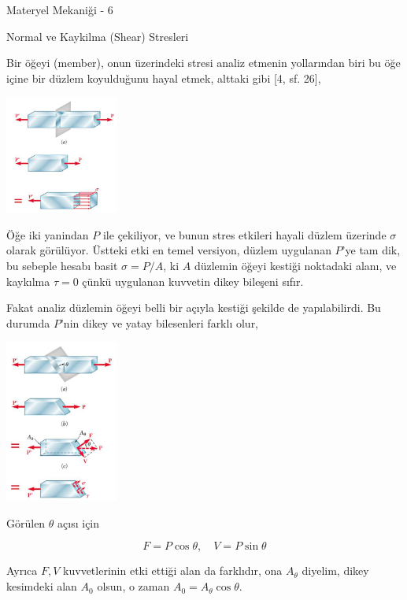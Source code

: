 \documentclass[12pt,fleqn]{article}\usepackage{../../common}
\begin{document}
Materyel Mekaniği - 6

Normal ve Kaykilma (Shear) Stresleri

Bir öğeyi (member), onun üzerindeki stresi analiz etmenin yollarından
biri bu öğe içine bir düzlem koyulduğunu hayal etmek, alttaki gibi [4, sf. 26],

\includegraphics[width=10em]{phy_020_strs_06_05.jpg}

Öğe iki yanindan $P$ ile çekiliyor, ve bunun stres etkileri hayali düzlem
üzerinde $\sigma$ olarak görülüyor. Üstteki etki en temel versiyon, düzlem
uygulanan $P$'ye tam dik, bu sebeple hesabı basit $\sigma = P / A$, ki $A$
düzlemin öğeyi kestiği noktadaki alanı, ve kaykılma $\tau = 0$ çünkü uygulanan
kuvvetin dikey bileşeni sıfır.

Fakat analiz düzlemin öğeyi belli bir açıyla kestiği şekilde de yapılabilirdi.
Bu durumda $P$'nin dikey ve yatay bilesenleri farklı olur, 

\includegraphics[width=10em]{phy_020_strs_06_06.jpg}

Görülen $\theta$ açısı için

$$
F = P \cos \theta, \quad V = P \sin \theta
$$

Ayrıca $F,V$ kuvvetlerinin etki ettiği alan da farklıdır, ona $A_\theta$
diyelim, dikey kesimdeki alan $A_0$ olsun, o zaman $A_0 = A_\theta \cos \theta$.
\end{document}
